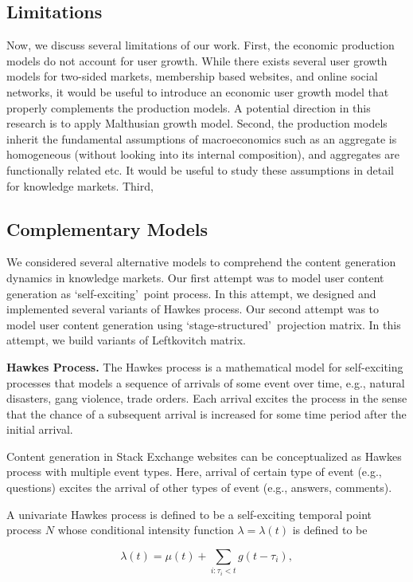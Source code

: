 \subsection{Limitations}
Now, we discuss several limitations of our work. First, the economic production models do not account for user growth. While there exists several user growth models for two-sided markets, membership based websites, and online social networks, it would be useful to introduce an economic user growth model that properly complements the production models. A potential direction in this research is to apply Malthusian growth model. Second, the production models inherit the fundamental assumptions of macroeconomics such as an aggregate is homogeneous (without looking into its internal composition), and aggregates are functionally related etc. It would be useful to study these assumptions in detail for knowledge markets. Third, 


\subsection{Complementary Models} 
We considered several alternative models to comprehend the content generation dynamics in knowledge markets. Our first attempt was to model user content generation as \lq self-exciting\rq\ point process. In this attempt, we designed and implemented several variants of Hawkes process. Our second attempt was to model user content generation using \lq stage-structured\rq\ projection matrix. In this attempt, we build variants of Leftkovitch matrix. 

\iffalse
\textbf{Hawkes Process.} The Hawkes process is a mathematical model for self-exciting processes that models a sequence of arrivals of some event over time, e.g., natural disasters, gang violence, trade orders.  Each arrival excites the process in the sense that the chance of a subsequent arrival is increased for some time period after the initial arrival. 

Content generation in Stack Exchange websites can be conceptualized as Hawkes process with multiple event types. Here, arrival of certain type of event (e.g., questions) excites the arrival of other types of event (e.g., answers, comments). 

A univariate Hawkes process is defined to be a self-exciting temporal point process $N$ whose conditional intensity function $\lambda = \lambda(t)$ is defined to be

 $$\lambda(t) = \mu(t)+\sum_{i:\tau_i<t}g(t-\tau_i),$$
 
